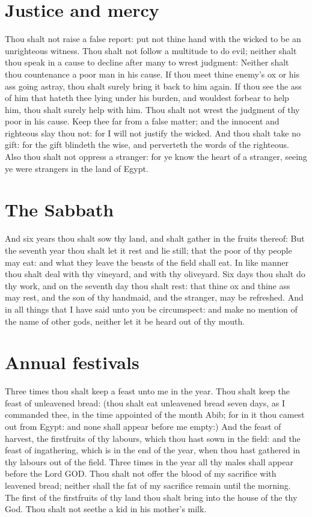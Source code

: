 \section*{Justice and mercy}
\begin{biblechapter} %
\verse Thou shalt not raise a false report: put not thine hand with the wicked to be an unrighteous witness.
\verse Thou shalt not follow a multitude to do evil; neither shalt thou speak in a cause to decline after many to wrest judgment:
\verse Neither shalt thou countenance a poor man in his cause.
\verse If thou meet thine enemy's ox or his ass going astray, thou shalt surely bring it back to him again.
\verse If thou see the ass of him that hateth thee lying under his burden, and wouldest forbear to help him, thou shalt surely help with him.
\verse Thou shalt not wrest the judgment of thy poor in his cause.
\verse Keep thee far from a false matter; and the innocent and righteous slay thou not: for I will not justify the wicked.
\verse And thou shalt take no gift: for the gift blindeth the wise, and perverteth the words of the righteous.
\verse Also thou shalt not oppress a stranger: for ye know the heart of a stranger, seeing ye were strangers in the land of Egypt.
\section*{The Sabbath}
\verse And six years thou shalt sow thy land, and shalt gather in the fruits thereof:
\verse But the seventh year thou shalt let it rest and lie still; that the poor of thy people may eat: and what they leave the beasts of the field shall eat. In like manner thou shalt deal with thy vineyard, and with thy oliveyard.
\verse Six days thou shalt do thy work, and on the seventh day thou shalt rest: that thine ox and thine ass may rest, and the son of thy handmaid, and the stranger, may be refreshed.
\verse And in all things that I have said unto you be circumspect: and make no mention of the name of other gods, neither let it be heard out of thy mouth.
\section*{Annual festivals}
\verse Three times thou shalt keep a feast unto me in the year.
\verse Thou shalt keep the feast of unleavened bread: (thou shalt eat unleavened bread seven days, as I commanded thee, in the time appointed of the month Abib; for in it thou camest out from Egypt: and none shall appear before me empty:)
\verse And the feast of harvest, the firstfruits of thy labours, which thou hast sown in the field: and the feast of ingathering, which is in the end of the year, when thou hast gathered in thy labours out of the field.
\verse Three times in the year all thy males shall appear before the Lord GOD.
\verse Thou shalt not offer the blood of my sacrifice with leavened bread; neither shall the fat of my sacrifice remain until the morning.
\verse The first of the firstfruits of thy land thou shalt bring into the house of the \LORD thy God. Thou shalt not seethe a kid in his mother's milk.

\end{biblechapter}
